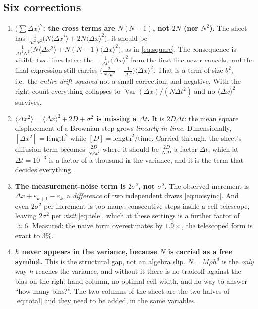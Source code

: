 \documentclass[11pt,a4paper]{article}
\newcommand{\dx}{\Delta x}
\newcommand{\dt}{\Delta t}
\begin{document}
\subsection*{Six corrections}

\begin{enumerate}[leftmargin=1.5em,itemsep=0.45em]

\item \textbf{$\big(\sum\dx\big)^{2}$: the cross terms are $N(N\!-\!1)$, not $2N$ (nor
$N^{2}$).} The sheet has
$\frac{1}{\dt^{2}N^{2}}\big(N\langle\dx^{2}\rangle+2N\langle\dx\rangle^{2}\big)$;
it should be $\frac{1}{\dt^{2}N^{2}}\big(N\langle\dx^{2}\rangle+N(N\!-\!1)\langle\dx\rangle^{2}\big)$,
as in \eqref{eq:square}. The consequence is visible two lines later: the
$-\frac{1}{\dt^{2}}\langle\dx\rangle^{2}$ from the first line never cancels, and the final
expression still carries $\big(\tfrac{2}{N\dt^{2}}-\tfrac{1}{\dt^{2}}\big)\langle\dx\rangle^{2}$.
That is a term of size $b^{2}$, i.e.\ the \emph{entire drift squared} \textemdash{} not a
small correction, and negative. With the right count everything collapses to
$\operatorname{Var}(\dx)/(N\dt^{2})$ and no $\langle\dx\rangle^{2}$ survives.

\item \textbf{$\langle\dx^{2}\rangle=\langle\dx\rangle^{2}+2D+\sigma^{2}$ is missing a
$\dt$.} It is $2D\dt$: the mean square displacement of a Brownian step grows
\emph{linearly in time}. Dimensionally, $[\dx^{2}]=\mathrm{length}^{2}$ while
$[D]=\mathrm{length}^{2}/\mathrm{time}$. Carried through, the sheet's diffusion term
becomes $\frac{2D}{N\dt^{2}}$ where it should be $\frac{2D}{N\dt}$ \textemdash{} a
factor $\dt$, which at $\dt=10^{-3}$ is a factor of a thousand in the variance, and it
is the term that decides everything.

\item \textbf{The measurement-noise term is $2\sigma^{2}$, not $\sigma^{2}$.} The
observed increment is $\dx+\varepsilon_{k+1}-\varepsilon_k$, a \emph{difference} of two
independent draws \eqref{eq:noisyinc}. And even $2\sigma^{2}$ per increment is too many:
consecutive steps inside a cell telescope, leaving $2\sigma^{2}$ per \emph{visit}
\eqref{eq:tele}, which at these settings is a further factor of $\approx6$.
Measured: the naive form overestimates by $1.9\times$, the telescoped form is exact to 3\%.

\item \textbf{$h$ never appears in the variance, because $N$ is carried as a free symbol.}
This is the structural gap, not an algebra slip. $N=M\rho h^{d}$ is the \emph{only} way
$h$ reaches the variance, and without it there is no tradeoff against the bias on the
right-hand column, no optimal cell width, and no way to answer ``how many bins?''.
The two columns of the sheet are the two halves of \eqref{eq:total} and they need to be
added, in the same variables.


\end{enumerate}
\end{document}
